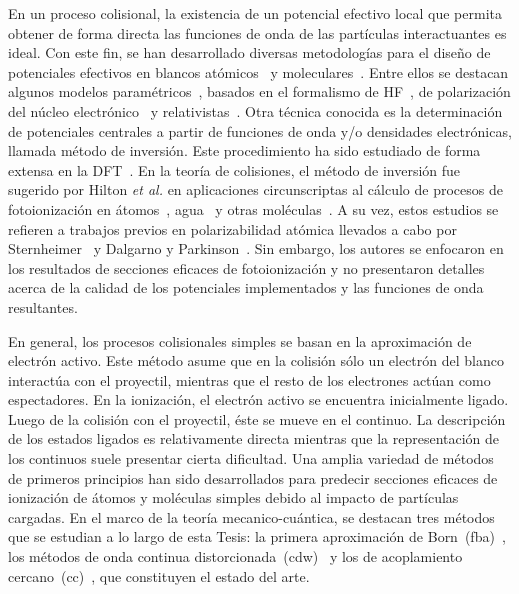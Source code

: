 En un proceso colisional, la existencia de un potencial efectivo local 
que permita obtener de forma directa las funciones de onda de las 
partículas interactuantes es ideal. Con este fin, se han desarrollado 
diversas metodologías para el diseño de potenciales efectivos en blancos 
atómicos~\cite{Hibbert:82} y moleculares~\cite{Menchero:10,Granados:16}. 
Entre ellos se destacan algunos modelos 
paramétricos~\cite{Gombas:56,Green:69,Klapisch:71}, basados en el 
formalismo de HF~\cite{Phillips:59,Herman:63}, de polarización del 
núcleo electrónico~\cite{Dalgarno:70,Bayliss:77} y 
relativistas~\cite{Cowan:76,Lee:77}. Otra técnica conocida es la 
determinación de potenciales centrales a partir de funciones de onda y/o 
densidades electrónicas, llamada método de inversión. Este procedimiento 
ha sido estudiado de forma extensa en la DFT~\cite{Wu:03,Gaiduk:13,
Ryabinkin:15,Schipper:97,deSilva:12,Kananenka:13,Jacob:11}. En 
la teoría de colisiones, el método de inversión fue sugerido por Hilton 
\textit{et al.} en aplicaciones circunscriptas al cálculo de procesos de 
fotoionización en átomos~\cite{Hilton:77,Suzer:77}, agua~\cite{Hilton:79} 
y otras moléculas~\cite{Hilton:80,Crljen:87}. A su vez, estos estudios 
se refieren a trabajos previos en polarizabilidad atómica llevados a 
cabo por Sternheimer~\cite{Sternheimer:54} y Dalgarno y 
Parkinson~\cite{Dalgarno:59}. Sin embargo, los autores se enfocaron en 
los resultados de secciones eficaces de fotoionización y no presentaron 
detalles acerca de la calidad de los potenciales implementados y las 
funciones de onda resultantes. 

En general, los procesos colisionales simples se basan en la 
aproximación de electrón activo. Este método asume que en la colisión 
sólo un electrón del blanco interactúa con el proyectil, mientras que el 
resto de los electrones actúan como espectadores. En la ionización, el 
electrón activo se encuentra inicialmente ligado. Luego de la colisión 
con el proyectil, éste se mueve en el continuo. La descripción de los 
estados ligados es relativamente directa mientras que la representación 
de los continuos suele presentar cierta dificultad. Una amplia variedad 
de métodos de primeros principios han sido desarrollados para predecir 
secciones eficaces de ionización de átomos y moléculas simples debido al 
impacto de partículas cargadas. En el marco de la teoría 
mecanico-cuántica, se destacan tres métodos que se estudian a lo largo 
de esta Tesis: la primera aproximación de 
Born~(\acs{fba})~\cite{Bates:62,McDowell:61}, los métodos de onda 
continua distorcionada~(\acs{cdw})~\cite{Crothers:10,Rivarola:87} y los 
de acoplamiento cercano~(\acs{cc})~\cite{Pindzola:07,Burke:11,
Pindzola:16,Bray:17}, que constituyen el estado del arte.

